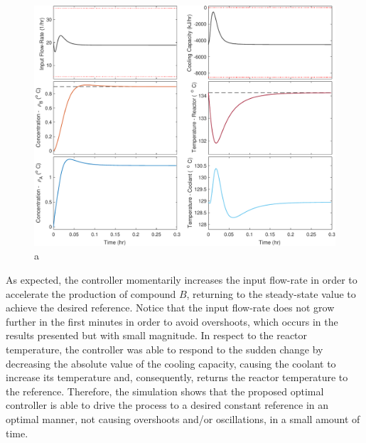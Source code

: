 \documentclass[a4paper,11pt]{book}
\numberwithin{figure}{chapter}
\numberwithin{equation}{chapter}
\numberwithin{table}{chapter}
\theoremstyle{definition}
\begin{document}
\begin{figure}[ht] \centering
	\includegraphics[width=\textwidth]{chapter7/lqr01}
	
	\caption{a}
	\label{fig:lqr01}
\end{figure}

As expected, the controller momentarily increases the input flow-rate in order to accelerate the production of compound $B$, returning to the steady-state value to achieve the desired reference. Notice that the input flow-rate does not grow further in the first minutes in order to avoid overshoots, which occurs in the results presented but with small magnitude. In respect to the reactor temperature, the controller was able to respond to the sudden change by decreasing the absolute value of the cooling capacity, causing the coolant to increase its temperature and, consequently, returns the reactor temperature to the reference. Therefore, the simulation shows that the proposed optimal controller is able to drive the process to a desired constant reference in an optimal manner, not causing overshoots and/or oscillations, in a small amount of time.
\end{document}
